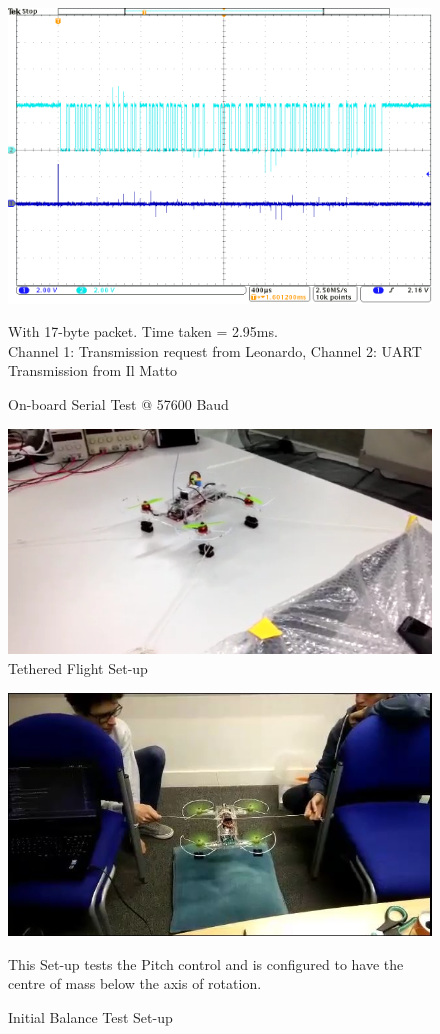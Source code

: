 \documentclass[a4paper,11pt]{article}
\begin{document}
\begin{figure}[!ht]
    \includegraphics[width=\textwidth]{57600_baud_comms.png}
    \caption{On-board Serial Test @ 57600 Baud}
    \medskip
    \small
    \centering
    With 17-byte packet. Time taken = 2.95ms.\\Channel 1: Transmission request from Leonardo, Channel 2: UART Transmission from Il Matto
    \label{fig:57600 Baud}
\end{figure}
\newpage
\begin{figure}[!ht]
    \includegraphics[width=\textwidth]{tethered.png}
    \caption{Tethered Flight Set-up}
    \label{fig:Tethered}
\end{figure}
\begin{figure}[!ht]
    \includegraphics[width=\textwidth]{initial_balance.jpg}
    \caption{Initial Balance Test Set-up}
    \medskip
    \small
    \centering
    This Set-up tests the Pitch control and is configured to have the centre of mass below the axis of rotation.
    \label{fig:Initial Balance}
\end{figure}
\end{document}
